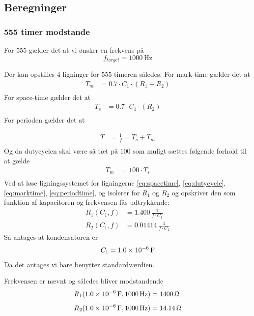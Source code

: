 \subsection{Beregninger}
\subsubsection{555 timer modstande} \label{calc:555timerResistance}
For 555 gælder det at vi ønsker en frekvens på 
\[
	f_{target} =  \SI{1000}{\hertz}
\]

Der kan opstilles 4 ligninger for 555 timeren således: 
For mark-time gælder det at
\begin{align}
	T_m &= 0.7 \cdot C_1 \cdot (R_1 + R_2) \label{eq:marktime} \\
\end{align}
For space-time gælder det at 
\begin{align}
	T_s &= 0.7 \cdot C_1 \cdot (R_2) \label{eq:spacetime} \\
\end{align}
For perioden gælder det at 

\begin{align}
	T &= \frac{1}{f} = T_s + T_m \label{eq:periodtime} \\
\end{align}
Og da dutycyclen skal være så tæt på $100$ som muligt sættes følgende forhold til at gælde
\begin{align}
	T_m &= 100 \cdot  T_s \label{eq:dutycycle} \\
\end{align}
Ved at løse ligningssystemet for ligningerne \ref{eq:spacetime}, \ref{eq:dutycycle}, \ref{eq:marktime}, \ref{eq:periodtime}, og isolerer for $R_1$ og $R_2$ og opskriver den som funktion af kapacitoren og frekvensen fås udtrykkende:
\begin{align}
	R_{1} \left( C_1,f \right) &= 1.400\,{\frac {1}{f \cdot C_1}} \\[2ex]
	R_{2} \left( C_1,f \right) &= 0.01414\,{\frac {1}{f \cdot C_1}}
\end{align}
Så antages at kondensatoren er 
\[
	C_1 = \SI{1.0d-6}{\farad}
\]
Da det antages vi bare benytter standardværdien. 

Frekvensen er nævnt og således bliver modstandende
\begin{align}
	R_1(\SI{1.0d-6}{\farad},\SI{1000}{\hertz})&= \SI{1400}{\ohm} \\[1ex]
	R_2(\SI{1.0d-6}{\farad},\SI{1000}{\hertz})&= \SI{14.14}{\ohm}
\end{align}


